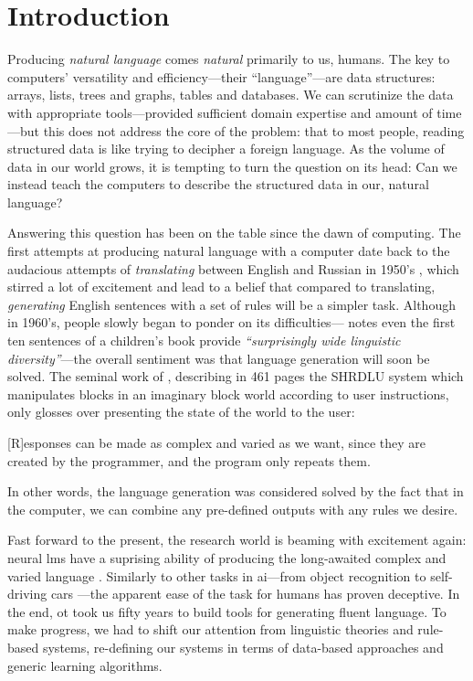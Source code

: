 \chapter{Introduction}
\label{chap:intro}
Producing \emph{natural language} comes \emph{natural} primarily to us, humans.
The key to computers' versatility and efficiency---their ``language''---are data structures: arrays, lists, trees and graphs, tables and databases.
We can scrutinize the data with appropriate tools---provided sufficient domain expertise and amount of time---but this does not address the core of the problem: that to most people, reading structured data is like trying to decipher a foreign language. As the volume of data in our world grows, it is tempting to turn the question on its head: Can we instead teach the computers to describe the structured data in our, natural language?


Answering this question has been on the table since the dawn of computing. The first attempts at producing natural language with a computer date back to the audacious attempts of \emph{translating} between English and Russian in 1950's \cite{sheridan1955research}, which stirred a lot of excitement and lead to a belief that compared to translating, \emph{generating} English sentences with a set of rules will be a simpler task. Although in 1960's, people slowly began to ponder on its difficulties---\citet{yngve1961random} notes even the first ten sentences of a children's book provide \emph{``surprisingly wide linguistic diversity''}---the overall sentiment was that language generation will soon be solved. The seminal work of \citet{winograd1971procedures}, describing in 461 pages the SHRDLU system which manipulates blocks in an imaginary block world according to user instructions, only glosses over presenting the state of the world to the user:
\begin{pquotation}{\citealp[p.384]{winograd1971procedures}}
    [R]esponses can be made as complex and varied as we want, since they are created by the programmer, and the program only repeats them.
\end{pquotation}
In other words, the language generation was considered solved by the fact that in the computer, we can combine any pre-defined outputs with any rules we desire.

Fast forward to the present, the research world is beaming with excitement again: neural \acp{lm} have a suprising ability of producing the long-awaited complex and varied language \cite{radford2019language,brown2020language}. Similarly to other tasks in \ac{ai}---from object recognition \cite{papert1966summer} to self-driving cars \cite{autonomouscars}---the apparent ease of the task for humans has proven deceptive. In the end, ot took us fifty years to build tools for generating fluent language. To make progress, we had to shift our attention from linguistic theories and rule-based systems, re-defining our systems in terms of data-based approaches and generic learning algorithms.

